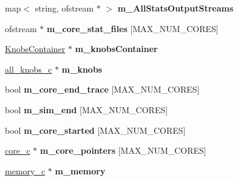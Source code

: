 \begin{DoxyCompactItemize}
\item 
\hypertarget{classmacsim__c_ae74712c35d2662c6627da38f2fc96992}{
map$<$ string, ofstream $\ast$ $>$ {\bfseries m\_\-AllStatsOutputStreams}}
\label{classmacsim__c_ae74712c35d2662c6627da38f2fc96992}

\item 
\hypertarget{classmacsim__c_ad59ecc14512d18d335d2bc9c74b3b172}{
ofstream $\ast$ {\bfseries m\_\-core\_\-stat\_\-files} \mbox{[}MAX\_\-NUM\_\-CORES\mbox{]}}
\label{classmacsim__c_ad59ecc14512d18d335d2bc9c74b3b172}

\item 
\hypertarget{classmacsim__c_a8f8662a1f009f001de4473dc99e0b773}{
\hyperlink{classKnobsContainer}{KnobsContainer} $\ast$ {\bfseries m\_\-knobsContainer}}
\label{classmacsim__c_a8f8662a1f009f001de4473dc99e0b773}

\item 
\hypertarget{classmacsim__c_aa24b0c838a197877aa3aa726fbc23d3d}{
\hyperlink{classall__knobs__c}{all\_\-knobs\_\-c} $\ast$ {\bfseries m\_\-knobs}}
\label{classmacsim__c_aa24b0c838a197877aa3aa726fbc23d3d}

\item 
\hypertarget{classmacsim__c_a560adba247bfd673eb14421abc9ac241}{
bool {\bfseries m\_\-core\_\-end\_\-trace} \mbox{[}MAX\_\-NUM\_\-CORES\mbox{]}}
\label{classmacsim__c_a560adba247bfd673eb14421abc9ac241}

\item 
\hypertarget{classmacsim__c_aaf2644cd3bd0b14d2329dca9b79bf4b6}{
bool {\bfseries m\_\-sim\_\-end} \mbox{[}MAX\_\-NUM\_\-CORES\mbox{]}}
\label{classmacsim__c_aaf2644cd3bd0b14d2329dca9b79bf4b6}

\item 
\hypertarget{classmacsim__c_ab940fac1230e2f823573771ef30e204b}{
bool {\bfseries m\_\-core\_\-started} \mbox{[}MAX\_\-NUM\_\-CORES\mbox{]}}
\label{classmacsim__c_ab940fac1230e2f823573771ef30e204b}

\item 
\hypertarget{classmacsim__c_af8a5d5ad197669d975ab385491bd2bff}{
\hyperlink{classcore__c}{core\_\-c} $\ast$ {\bfseries m\_\-core\_\-pointers} \mbox{[}MAX\_\-NUM\_\-CORES\mbox{]}}
\label{classmacsim__c_af8a5d5ad197669d975ab385491bd2bff}

\item 
\hypertarget{classmacsim__c_ab07b52a087b78401fc29cf15f504e192}{
\hyperlink{classmemory__c}{memory\_\-c} $\ast$ {\bfseries m\_\-memory}}
\label{classmacsim__c_ab07b52a087b78401fc29cf15f504e192}


\end{DoxyCompactItemize}
